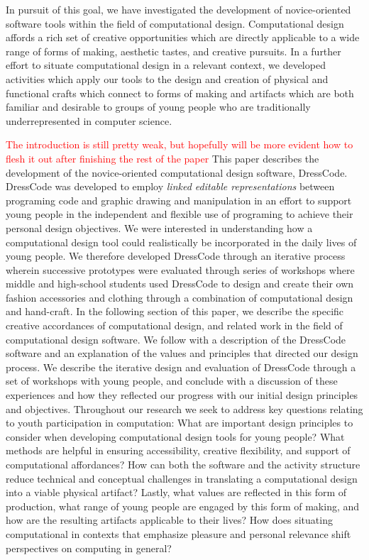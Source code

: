 \documentclass{sigchi}
\begin{document}
In pursuit of this goal, we have investigated the development of novice-oriented software tools within the field of computational design. Computational design affords a rich set of creative opportunities which are directly applicable to a wide range of forms of making, aesthetic tastes, and creative pursuits. In a further effort to situate computational design in a relevant context, we developed activities which apply our tools to the design and creation of physical and functional crafts which connect to forms of making and artifacts which are both familiar and desirable to groups of young people who are traditionally underrepresented in computer science.

\textcolor{red}{The introduction is still pretty weak, but hopefully will be more evident how to flesh it out after finishing the rest of the paper}
This paper describes the development of the novice-oriented computational design software, DressCode. DressCode was developed to employ \textit{linked editable representations} between programing code and graphic drawing and manipulation in an effort to support young people in the independent and flexible use of programing to achieve their personal design objectives. We were interested in understanding how a computational design tool could realistically be incorporated in the daily lives of young people. We therefore developed DressCode through an iterative process wherein successive prototypes were evaluated through series of workshops where middle and high-school students used DressCode to design and create their own fashion accessories and clothing through a combination of computational design and hand-craft. In the following section of this paper, we describe the specific creative accordances of computational design, and related work in the field of computational design software. We follow with a description of the DressCode software and an explanation of the values and principles that directed our design process. We describe the iterative design and evaluation of DressCode through a set of workshops with young people, and conclude with a discussion of these experiences and how they reflected our progress with our initial design principles and objectives. Throughout our research we seek to address key questions relating to youth participation in computation: What are important design principles to consider when developing computational design tools for young people? What methods are helpful in ensuring accessibility, creative flexibility, and support of computational affordances? How can both the software and the activity structure reduce technical and conceptual challenges in translating a computational design into a viable physical artifact? Lastly, what values are reflected in this form of production, what range of young people are engaged by this form of making, and how are the resulting artifacts applicable to their lives? How does situating computational in contexts that emphasize pleasure and personal relevance shift perspectives on computing in general? 
\end{document}
